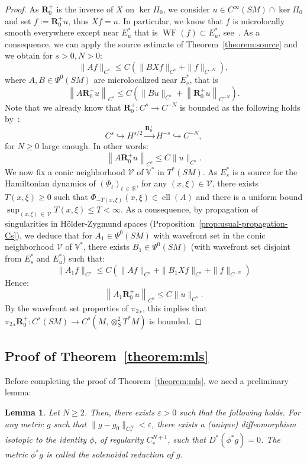 \documentclass[10pt]{amsart}
\newtheorem{lemm}[theo]{Lemma}\newtheorem{prop}[theo]{Proposition}\newtheorem{coro}[theo]{Corollary}\newtheorem{conj}[theo]{Conjecture}
\theoremstyle{definition}\newtheorem{defi}[theo]{Definition}\newtheorem{rema}[theo]{Remark}\newtheorem{exam}[theo]{Example}\newtheorem{exem}[theo]{Example}\newtheorem{nota}[theo]{Notation}
\newcommand{\R}{\mathbb{R}}
\newcommand{\RR}{\mathbf{R}}
\newcommand{\V}{\mathbb{V}}
\newcommand{\eps}{\varepsilon}
\newcommand{\mc}{\mathcal}
\DeclareMathOperator{\Ell}{ell}
\DeclareMathOperator{\WF}{WF}
\begin{document}
\begin{proof}
As $\RR_0^+$ is the inverse of $X$ on $\ker \Pi_0$, we consider $u \in C^\infty(SM) \cap \ker \Pi_0$ and set $f := \RR_0^+ u$, thus $Xf = u$. In particular, we know that $f$ is microlocally smooth everywhere except near $E_u^*$ that is $\WF(f) \subset E_u^*$, see~\cite[Proposition~3.3]{Dyatlov-Zworski-16}. As a consequence, we can apply the source estimate of Theorem~\ref{theorem:source} and we obtain for $s > 0, N > 0$:
\[
\|Af\|_{C^s} \leq C\left(\|BXf\|_{C^{s}} + \|f\|_{C^{-N}} \right),
\]
where $A,B \in \Psi^0(SM)$ are microlocalized near $E_s^*$, that is
\[
\left\|A \RR_0^+ u\right\|_{C^s} \leq C\left(\|B u\|_{C^{s}} + \left\|\RR_0^+ u\right\|_{C^{-N}} \right).
\]
Note that we already know that $\RR_0^+ : C^s \rightarrow C^{-N}$ is bounded as the following holds by~\cite[Theorem~2.6]{Guillarmou-17-1}: 
\[
C^s \hookrightarrow H^{s/2} \overset{\RR_0^+}{\rightarrow} H^{-s} \hookrightarrow C^{-N}, 
\]
for $N \geq 0$ large enough. In other words:
\[
\left\|A \RR_0^+ u\right\|_{C^s} \leq C\|u\|_{C^s}.
\]
We now fix a conic neighborhood $\mc{V}$ of $\V^*$ in $T^*(SM)$. As $E_s^*$ is a source for the Hamiltonian dynamics of $(\Phi_t)_{t\,\in \,\R}$, for any $(x,\xi) \in \mc{V}$, there exists $T(x,\xi) \geq 0$ such that $\Phi_{-T(x,\xi)}(x,\xi) \in \Ell(A)$ and there is a uniform bound $\sup_{(x,\xi)\,\in\,\mc{V}} T(x,\xi) \leq T < \infty$. As a consequence, by propagation of singularities in H\"older-Zygmund spaces (Proposition~\ref{prop:usual-propagation-Cs}), we deduce that for $A_1 \in \Psi^0(SM)$ with wavefront set in the conic neighborhood $\mc{V}$ of $\V^*$, there exists $B_1 \in \Psi^0(SM)$ (with wavefront set disjoint from $E_s^*$ and $E_u^*$) such that:
\[
\|A_1f\|_{C^s} \leq C\left(\|Af\|_{C^s} + \|B_1Xf\|_{C^s} + \|f\|_{C^{-N}} \right)
\]
Hence:
\[
\left\|A_1 \RR_0^+ u\right\|_{C^s} \leq C \|u\|_{C^s}.
\]
By the wavefront set properties of ${\pi_2}_*$, this implies that ${\pi_2}_* \RR_0^+ : C^s(SM) \rightarrow C^s(M,\otimes^2_S T^*M)$ is bounded.
\end{proof}

\subsection{Proof of Theorem~\ref{theorem:mls}}
Before completing the proof of Theorem~\ref{theorem:mls}, we need a preliminary lemma:

\begin{lemm}\label{lemma:reduction}
Let $N \geq 2$. Then, there exists $\eps > 0$ such that the following holds. For any metric $g$ such that $\|g-g_0\|_{C_*^N} < \eps$, there exists a (unique) diffeomorphism isotopic to the identity $\phi$, of regularity $C_*^{N+1}$, such that $D^*(\phi^*g) = 0$. The metric $\phi^*g$ is called the \emph{solenoidal reduction} of $g$.
\end{lemm}
\end{document}
